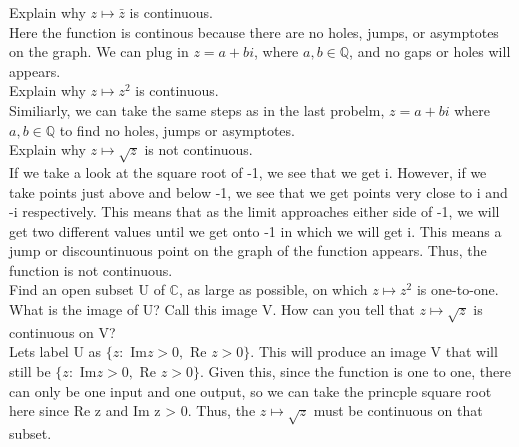 \documentclass[12pt]{article}
\begin{document}
 Explain why $z \mapsto \bar{z}$ is continuous.\\

Here the function is continous because there are no holes, jumps, or asymptotes on the graph.
We can plug in $z = a + bi$, where $a,b \in \mathbb{Q}$, and no gaps or holes will appears.\\

 Explain why $z \mapsto z^2$ is continuous.\\

Similiarly, we can take the same steps as in the last probelm, $z = a + bi$ where $a,b \in \mathbb{Q}$ to find no holes, jumps or asymptotes.\\

 Explain why $z \mapsto \sqrt{z}$ is not continuous.\\

If we take a look at the square root of -1, we see that we get i. 
However, if we take points just above and below -1, we see that we get points very close to i and -i respectively. 
This means that as the limit approaches either side of -1, we will get two different values until we get onto -1 in which we will get i.
This means a jump or discountinuous point on the graph of the function appears.
Thus, the function is not continuous.\\


 Find an open subset U of $\mathbb{C}$, as large as possible, on which $z \mapsto z^2$ is one-to-one.
What is the image of U? Call this image V. 
How can you tell that $z \mapsto \sqrt{z}$ is continuous on V?\\

Lets label U as $\{z : $ Im$ z > 0, $ Re $z > 0 \}$.
This will produce an image V that will still be $\{z : $ Im$ z > 0, $ Re $z > 0 \}$.
Given this, since the function is one to one, there can only be one input and one output, so we can take the princple square root here since Re z and Im z > 0.
Thus, the $z \mapsto \sqrt{z}$ must be continuous on that subset.\\
\end{document}
